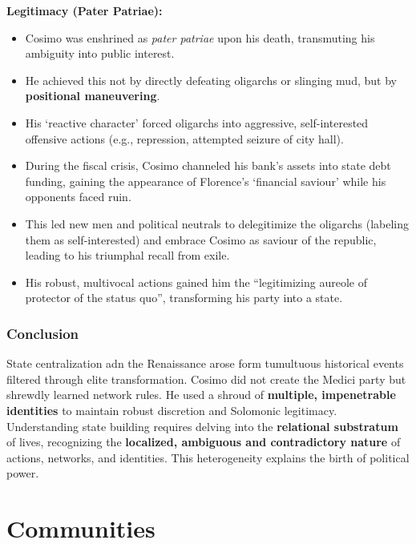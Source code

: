 \documentclass{article}
\begin{document}
    \noindent \textbf{Legitimacy (Pater Patriae):}
    \begin{itemize}
        \item Cosimo was enshrined as \textit{pater patriae} upon his death,
        transmuting his ambiguity into public interest.
        \item He achieved this not by directly defeating oligarchs or
        slinging mud, but by \textbf{positional maneuvering}.
        \item His `reactive character' forced oligarchs into aggressive,
        self-interested offensive actions (e.g., repression, attempted
        seizure of city hall).
        \item During the fiscal crisis, Cosimo channeled his bank's assets
        into state debt funding, gaining the appearance of Florence's
        `financial saviour' while his opponents faced ruin.
        \item This led new men and political neutrals to delegitimize the
        oligarchs (labeling them as self-interested) and embrace Cosimo as
        saviour of the republic, leading to his triumphal recall from exile.
        \item His robust, multivocal actions gained him the ``legitimizing
        aureole of protector of the status quo'', transforming his party
        into a state.
    \end{itemize}

    \subsubsection{Conclusion}

    \noindent State centralization adn the Renaissance arose form tumultuous
historical events filtered through elite transformation. Cosimo did not
create the Medici party but shrewdly learned network rules. He used a shroud
of \textbf{multiple, impenetrable identities} to maintain robust discretion
and Solomonic legitimacy.\\

    \noindent Understanding state building requires delving into the
\textbf{relational substratum} of lives, recognizing the
\textbf{localized, ambiguous and contradictory nature} of actions, networks,
and identities. This heterogeneity explains the birth of political power.


    \section{Communities}
\end{document}
